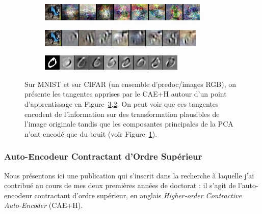 \begin{figure}
\centering
\begin{subfigure}{0.9\linewidth}
\includegraphics[width=0.9\linewidth]{predoc/images/pca.png}
\label{fig:tan_pca}
\end{subfigure}

\begin{subfigure}{0.9\linewidth}
\includegraphics[width=0.9\linewidth]{predoc/images/tangents_cifar.png}
\label{fig:tan_cifar}
\end{subfigure}

\begin{subfigure}{0.9\linewidth}
\includegraphics[width=0.9\linewidth]{predoc/images/tangents_mnist.png}
\label{fig:tan_mnist}
\end{subfigure}


   \caption{ Sur MNIST et sur CIFAR (un ensemble d'predoc/images RGB), on présente les
   tangentes apprises par le CAE+H autour d'un point d'apprentissage en
   Figure~\ref{fig:tan_mnist},\ref{fig:tan_cifar}. On peut voir que ces
   tangentes encodent de l'information sur des transformation plausibles de
   l'image originale tandis que les composantes principales de la PCA n'ont
   encodé que du bruit (voir Figure~\ref{fig:tan_pca}). 
\label{fig:tan}}

\end{figure}





\subsubsection{Auto-Encodeur Contractant d'Ordre Supérieur}

Nous présentons ici une publication qui s'inscrit dans la recherche à laquelle j'ai contribué
au cours de mes deux premières années de doctorat \cite{Salah+al-2011}: il s'agit
de l'auto-encodeur contractant d'ordre supérieur, en anglais
\textit{Higher-order Contractive Auto-Encoder} (CAE+H).


